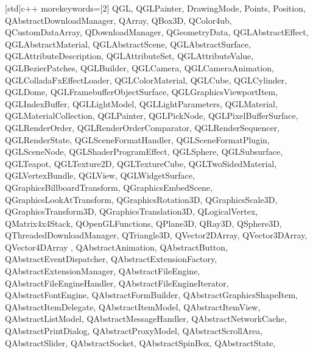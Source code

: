 [std]{c++}
{
    morekeywords=[2]{
        QGL,
        QGLPainter,
        DrawingMode,
        Points,
        Position,
        QAbstractDownloadManager,
        QArray,
        QBox3D,
        QColor4ub,
        QCustomDataArray,
        QDownloadManager,
        QGeometryData,
        QGLAbstractEffect,
        QGLAbstractMaterial,
        QGLAbstractScene,
        QGLAbstractSurface,
        QGLAttributeDescription,
        QGLAttributeSet,
        QGLAttributeValue,
        QGLBezierPatches,
        QGLBuilder,
        QGLCamera,
        QGLCameraAnimation,
        QGLColladaFxEffectLoader,
        QGLColorMaterial,
        QGLCube,
        QGLCylinder,
        QGLDome,
        QGLFramebufferObjectSurface,
        QGLGraphicsViewportItem,
        QGLIndexBuffer,
        QGLLightModel,
        QGLLightParameters,
        QGLMaterial,
        QGLMaterialCollection,
        QGLPainter,
        QGLPickNode,
        QGLPixelBufferSurface,
        QGLRenderOrder,
        QGLRenderOrderComparator,
        QGLRenderSequencer,
        QGLRenderState,
        QGLSceneFormatHandler,
        QGLSceneFormatPlugin,
        QGLSceneNode,
        QGLShaderProgramEffect,
        QGLSphere,
        QGLSubsurface,
        QGLTeapot,
        QGLTexture2D,
        QGLTextureCube,
        QGLTwoSidedMaterial,
        QGLVertexBundle,
        QGLView,
        QGLWidgetSurface,
        QGraphicsBillboardTransform,
        QGraphicsEmbedScene,
        QGraphicsLookAtTransform,
        QGraphicsRotation3D,
        QGraphicsScale3D,
        QGraphicsTransform3D,
        QGraphicsTranslation3D,
        QLogicalVertex,
        QMatrix4x4Stack,
        QOpenGLFunctions,
        QPlane3D,
        QRay3D,
        QSphere3D,
        QThreadedDownloadManager,
        QTriangle3D,
        QVector2DArray,
        QVector3DArray,
        QVector4DArray ,
        QAbstractAnimation,
        QAbstractButton,
        QAbstractEventDispatcher,
        QAbstractExtensionFactory,
        QAbstractExtensionManager,
        QAbstractFileEngine,
        QAbstractFileEngineHandler,
        QAbstractFileEngineIterator,
        QAbstractFontEngine,
        QAbstractFormBuilder,
        QAbstractGraphicsShapeItem,
        QAbstractItemDelegate,
        QAbstractItemModel,
        QAbstractItemView,
        QAbstractListModel,
        QAbstractMessageHandler,
        QAbstractNetworkCache,
        QAbstractPrintDialog,
        QAbstractProxyModel,
        QAbstractScrollArea,
        QAbstractSlider,
        QAbstractSocket,
        QAbstractSpinBox,
        QAbstractState,
}}
